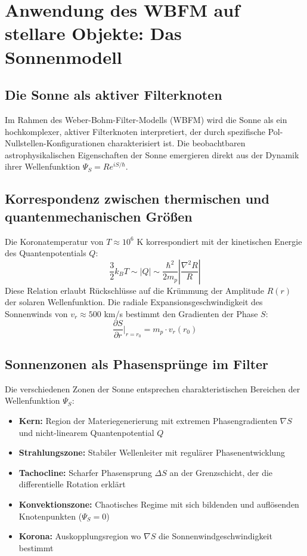 \section{Anwendung des WBFM auf stellare Objekte: Das Sonnenmodell}

\subsection{Die Sonne als aktiver Filterknoten}

Im Rahmen des Weber-Bohm-Filter-Modells (WBFM) wird die Sonne als ein hochkomplexer, aktiver Filterknoten interpretiert, der durch spezifische Pol-Nullstellen-Konfigurationen charakterisiert ist. Die beobachtbaren astrophysikalischen Eigenschaften der Sonne emergieren direkt aus der Dynamik ihrer Wellenfunktion \(\Psi_S = R e^{iS/\hbar}\).

\subsection{Korrespondenz zwischen thermischen und quantenmechanischen Größen}

Die Koronatemperatur von \(T \approx 10^6\) K korrespondiert mit der kinetischen Energie des Quantenpotentials \(Q\):
\[
\frac{3}{2} k_B T \sim |Q| \sim \frac{\hbar^2}{2m_p} \left| \frac{\nabla^2 R}{R} \right|
\]
Diese Relation erlaubt Rückschlüsse auf die Krümmung der Amplitude \(R(r)\) der solaren Wellenfunktion. Die radiale Expansionsgeschwindigkeit des Sonnenwinds von \(v_r \approx 500\) km/s bestimmt den Gradienten der Phase \(S\):
\[
\frac{\partial S}{\partial r} \Big|_{r=r_0} = m_p \cdot v_r(r_0)
\]

\subsection{Sonnenzonen als Phasensprünge im Filter}

Die verschiedenen Zonen der Sonne entsprechen charakteristischen Bereichen der Wellenfunktion \(\Psi_S\):

\begin{itemize}
\item \textbf{Kern:} Region der Materiegenerierung mit extremen Phasengradienten \(\nabla S\) und nicht-linearem Quantenpotential \(Q\)
\item \textbf{Strahlungszone:} Stabiler Wellenleiter mit regulärer Phasenentwicklung
\item \textbf{Tachocline:} Scharfer Phasensprung \(\Delta S\) an der Grenzschicht, der die differentielle Rotation erklärt
\item \textbf{Konvektionszone:} Chaotisches Regime mit sich bildenden und auflösenden Knotenpunkten (\(\Psi_S = 0\))
\item \textbf{Korona:} Auskopplungsregion wo \(\nabla S\) die Sonnenwindgeschwindigkeit bestimmt
\end{itemize}

